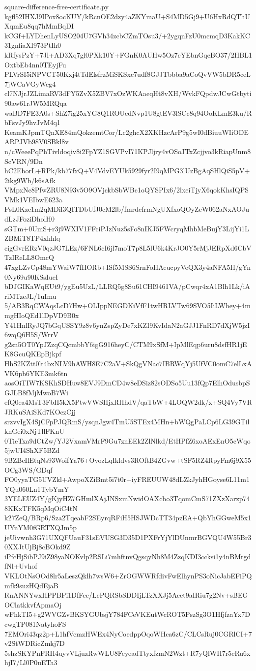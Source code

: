 \documentclass[11pt]{article}
\theoremstyle{definition}
\theoremstyle{remark}
\begin{document}
\begin{filecontents*}[overwrite]{square-difference-free-certificate.py}
kgfl52IHXJ9IPox8ocKUY/kRcnOE2dzy4aZKYmaU+S4MD5Gj9+U6HxRdQThUXqmEu8qq7hMmBqDI
kCGf+LYDhenLyUSO204U7GVh34zcbCZmTOsu3/+2ygqnFzU0mcmqD3KakKC31gnfiaXI973PtIh0
kRfysPzY+7Jl+AD3Xq7gl0PXk10Y+FGnK0AUHw5Oz7cYEbnGqeBO37/2HBL1OxtbEb4nn0TEyjFu
PLVrSI5iNPVCT50Kxj4tTdElsfrzMiSKSxc7udf8GJJTbbba9aCoQvVW5bDR5ceL7jWCaVGyWeg4
cl7NJjrJZLimaRV3dFY5ZvX5ZBV7xOzWKAaeqHt8vXH/WvkFQpdwJCwGtbyti90aw61rJW5MRQqa
waBD7FE3A0s+ShZ7ig25xYG8Q1ROUedNvp1U8gtEV3lSCc8q94OoKLmE3ku/RbFsvJy9hvJvM4q1
KeamKJpmTQnXE84mQokzemtCor/Lc2ghcX2XKHzcArP9g5wI0dBiuuWIiODEARPJVb98V0SBkl8v
n/cWeeePqPhTivldoqiv8i2FpYZ1SGVPvI71KPJljry4vOSoJTxZcjjvo3kRiapUnm8ScVRN/9Dn
hC2EborL+RPk/kb77fxQ+V4VdvEYUk5929fyr2I9qMPG3lUzBgAqSHlQiS5pV+2ikg9Wb/k6sAfk
VMpxNc8PfwZRU8N93v5O9OVjckbSbWBc1oQYSPIx6/2lxeiTjyX6qokKhsIQPSVMk1VEIbwE623a
PsL0Kzc1m2qMDil3QITDbUfJ0cM2lb/fmrdcfrmNgUXfxoQOyZcW062aNxAOJudLzJFoziDholH0
sGTm+0UmS+r3j9WXIV1FFciPJzNuz5sFo8nIKJ5FWcryqMhbMeBujY3LijYi1LZBMiT8TP4xhhlq
cigGvrERzV0qzJG7LEz/6FNL6cI6jl7moT7p8L5lU6k4KrJO0Y5rMjJERpXd6CbVTzIReLL8OmcQ
47xgLZvCp48mYWaiW7fHORb+ISf5MSS6SrnFoHAeucpyVeQX3y4aNFA5H/gYn0Ny69u90KSsIueI
bDJGIKaWqEUt9/ygEu5UzL/LLRQ5g8Su61CHI9461VA/pCwqr4xA1Blh1Lk/iAriMTzeJL/1uImu
5/AB3RqCWAqsLcD7Hw+OLIppNEGDKiVfF1twHRLVTw69SVO5IiLWhey+4mmgHIoQEd1lDpVD9B0x
Y41HnlRyJQ7bGqUSSY9z8v6ynZspZyDe7xKZI9KvIdaN2aGJJ1FnRD7dXjW5jzI6wqQ6H5S/WrrV
g2sn5OT0YpJZzqCQcmbbY6igG916heyC/CTM9xSfM+IpMlEqp6uru8dsfHR1jEK8GcuQKEpBjkpf
HhS2KZtt0lt4bxNLV9hAWH8E7C2aV+SkQgVNac7IBRWqYj5UfVC0omC7elLxAVK6pb6YKE3mk6tn
aosOiTIW7KSKhSDHuw8EVJ9DmCD4w8eDSiz82sODSo5Uu13fQp7ElhOdusbpSGJLB8fMjMwoB7Wi
efQ0ea4MsT3FbH5kX5PtwVWSHjxRHhdV/qaTbW+4LOQW2dk/x+SQ4Vy7VRJRKuSAiSKd7KOczCjj
srzvvIgX4SjCFpPJQRmS/ysqnJgw4TmU5STEx4MHn+bWQgPaLCp6LG39GTilknGei0xNjTllFKnU
0TieTxa9dCtZw/YJ2VxamVMrF9Gu7znEEk2ZlNlkd/EtHPfZ6xoAExEnO5cWqo5jwUI4ShXF5BZd
9BZBeIlEtqNs93WoifYa76+OvozLqIkldvs3ROftB4ZGvw+tSF5RZ4RpyFm6j9X55OCg3WS/GDqf
FO0yyaTG5UVZkl+AwpoXZiBmt5i7t0r+iyFREUUW48dLZkJyhHGoyse6L11m1YQu060Ln1TybYmY
3YELEUZ4Y/gKjyHZ7GHmlXAjJNSxmNwidOAXcbo3TqomCmS71ZXzXarzp748KKxTFK5qMqOiC4tN
k27ZeQ/BRp6/Sza2TqeabF2SEyrqRFiH5HSJWDcTT34pzEA+QbYhGGweM5x1UYnYM0fGRTXQJm5p
jeUivwnh3G71UXQFUauF31sEVUSG3D35D1PXFrYjYlDUnmrBGVQU4W55Br30XXJtUjBj8cBOkd9Z
iPfcHjSibPJ9iZ98yaNOKvlp2RSLi7mhftnvQgsqyNh8M4ZzqKDI3ccksi1y4nBMrgdfNl+Uvhof
VKLOtNsOOd8lr5aLeszQklh7wsW6+ZrOGWWRfdivFwElhynPS3oNicJabEFiPQmfk9suzHQdEjaB
RnANNYwxHPPBPi1DfFec/LcPQRSbSDDIjLTzXXJj5Acet9aIRiu7g2Nv+sBEGOClatkkvfApmaOj
wFhkTI5+g2WVGZvBKSYGUbsjY784FCeVKEutWcROT5PszSg3O1HfjfzaYx7DcwgTP081NatyhoFS
7EMOri43qz2p+L1hfVcmzHWEx4NyCoedppOqoWHca6zC/CLCsRuj0CGRlCI+7v2StWDRicZmkj7D
5shzSKYPnFRH4uyvVLjuzRwWLU8FeyeadTtyxfzmN2Wzt+R7yQlWH7r5cRu6xhjI7/Ll0P0uETa3

\end{filecontents*}
\end{document}
